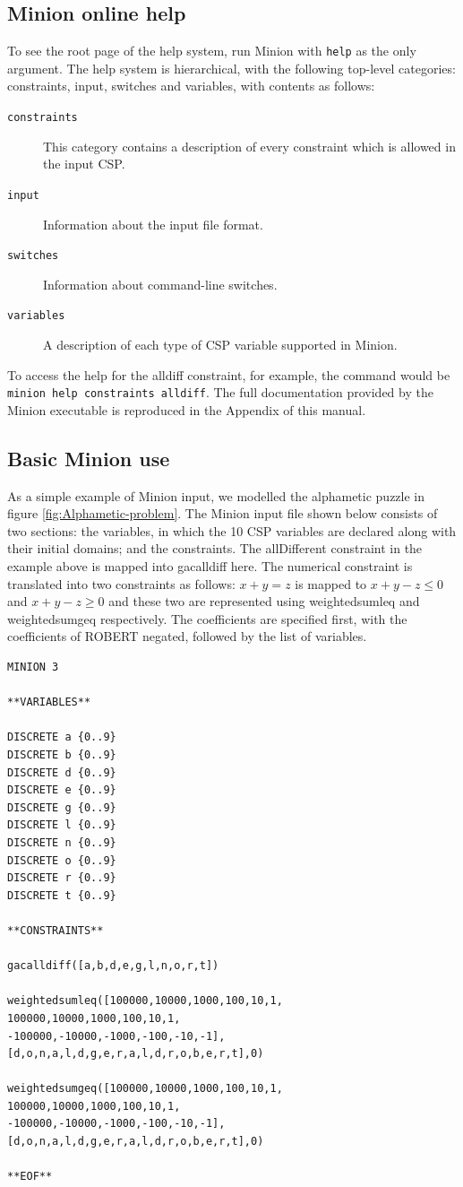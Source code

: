 \documentclass[oneside]{book}
\begin{document}
\subsection{Minion online help}

To see the root page of the help system, run Minion with \texttt{help}
as the only argument. The help system is hierarchical, with the following
top-level categories: constraints, input, switches and variables,
with contents as follows:

\begin{description}
\item [{\texttt{constraints}}] This category contains a description of
every constraint which is allowed in the input CSP.
\item [{\texttt{input}}] Information about the input file format.
\item [{\texttt{switches}}] Information about command-line switches.
\item [{\texttt{variables}}] A description of each type of CSP variable
supported in Minion.
\end{description}
To access the help for the alldiff constraint, for example, the command
would be \texttt{minion help constraints alldiff}. The full documentation
provided by the Minion executable is reproduced in the Appendix of 
this manual.


\subsection{Basic Minion use}

As a simple example of Minion input, we modelled the alphametic puzzle
in figure \ref{fig:Alphametic-problem}. The Minion input file shown
below consists of two sections: the variables, in which the 10 CSP
variables are declared along with their initial domains; and the constraints.
The allDifferent constraint in the example above is mapped into gacalldiff
here. The numerical constraint is translated into two constraints
as follows: $x+y=z$ is mapped to $x+y-z\le0$ and $x+y-z\ge0$ and
these two are represented using weightedsumleq and weightedsumgeq
respectively. The coefficients are specified first, with the coefficients
of ROBERT negated, followed by the list of variables.

\begin{verbatim}
MINION 3

**VARIABLES**

DISCRETE a {0..9}
DISCRETE b {0..9}
DISCRETE d {0..9}
DISCRETE e {0..9}
DISCRETE g {0..9}
DISCRETE l {0..9}
DISCRETE n {0..9}
DISCRETE o {0..9}
DISCRETE r {0..9}
DISCRETE t {0..9}

**CONSTRAINTS**

gacalldiff([a,b,d,e,g,l,n,o,r,t])

weightedsumleq([100000,10000,1000,100,10,1,
100000,10000,1000,100,10,1,
-100000,-10000,-1000,-100,-10,-1],
[d,o,n,a,l,d,g,e,r,a,l,d,r,o,b,e,r,t],0)

weightedsumgeq([100000,10000,1000,100,10,1,
100000,10000,1000,100,10,1,
-100000,-10000,-1000,-100,-10,-1],
[d,o,n,a,l,d,g,e,r,a,l,d,r,o,b,e,r,t],0)

**EOF**
\end{verbatim}
\end{document}
